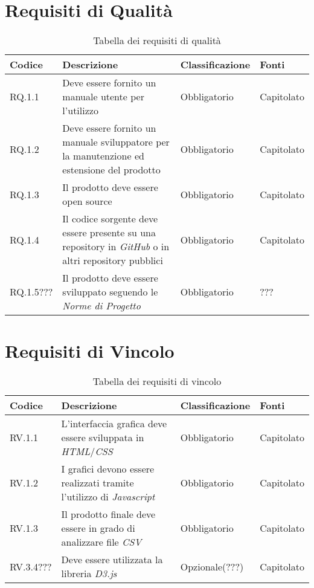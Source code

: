 \section{Requisiti di Qualità}
\begin{table}[H]
  \centering
  \begin{tabular}{|p{}|p{6cm}|p{3cm}|p{2cm}|}
    \hline
    \rowcolor[HTML]{036400}
    {\color[HTML]{FFFFFF} \textbf{Codice}} & {\color[HTML]{FFFFFF} \textbf{Descrizione}} & {\color[HTML]{FFFFFF} \textbf{Classificazione}} & {\color[HTML]{FFFFFF} \textbf{Fonti}} \\ \hline
    \rowcolor[HTML]{EFEFEF}
    RQ.1.1 & Deve essere fornito un manuale utente per l'utilizzo & Obbligatorio & Capitolato \\ \hline
    \rowcolor[HTML]{C0C0C0}
    RQ.1.2 & Deve essere fornito un manuale sviluppatore per la manutenzione ed estensione del prodotto & Obbligatorio & Capitolato \\ \hline
    \rowcolor[HTML]{EFEFEF}
    RQ.1.3 & Il prodotto deve essere open source & Obbligatorio & Capitolato \\ \hline
    \rowcolor[HTML]{C0C0C0}
    RQ.1.4 & Il codice sorgente deve essere presente su una repository in \textit{GitHub} o in altri repository pubblici & Obbligatorio & Capitolato \\ \hline
    \rowcolor[HTML]{EFEFEF}
    RQ.1.5??? & Il prodotto deve essere sviluppato seguendo le \textit{Norme di Progetto} & Obbligatorio & ??? \\ \hline
  \end{tabular}
  \caption{Tabella dei requisiti di qualità}
\end{table}

\section{Requisiti di Vincolo}
\begin{table}[H]
  \centering
  \begin{tabular}{|p{}|p{6cm}|p{3cm}|p{2cm}|}
    \hline
    \rowcolor[HTML]{036400}
    {\color[HTML]{FFFFFF} \textbf{Codice}} & {\color[HTML]{FFFFFF} \textbf{Descrizione}} & {\color[HTML]{FFFFFF} \textbf{Classificazione}} & {\color[HTML]{FFFFFF} \textbf{Fonti}} \\ \hline
    \rowcolor[HTML]{EFEFEF}
    RV.1.1 & L'interfaccia grafica deve essere sviluppata in \textit{HTML}/\textit{CSS} & Obbligatorio & Capitolato \\ \hline
    \rowcolor[HTML]{C0C0C0}
    RV.1.2 & I grafici devono essere realizzati tramite l'utilizzo di \textit{Javascript} & Obbligatorio & Capitolato \\ \hline
    \rowcolor[HTML]{EFEFEF}
    RV.1.3 & Il prodotto finale deve essere in grado di analizzare file \textit{CSV} & Obbligatorio & Capitolato \\ \hline
    \rowcolor[HTML]{C0C0C0}
    RV.3.4??? & Deve essere utilizzata la libreria \textit{D3.js} & Opzionale(???) & Capitolato \\ \hline
  \end{tabular}
  \caption{Tabella dei requisiti di vincolo}
\end{table}

